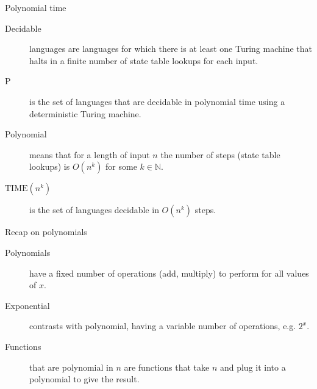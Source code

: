 \begin{frame}{Polynomial time}
  
  
  \begin{description}
    \item[Decidable] languages are languages for which there is at least one Turing machine that halts in a finite number of state table lookups for each input.
    \item[P] is the set of languages that are decidable in polynomial time using a deterministic Turing machine.
    \item[Polynomial] means that for a length of input \( n \) the number of steps (state table lookups) is \( O(n^k) \) for some \( k \in \mathbb{N} \).
    \item[\( \text{TIME}(n^k) \)] is the set of languages decidable in \( O(n^k) \) steps.
  \end{description}

\end{frame}


\begin{frame}[fragile]{Recap on polynomials}
  
  
  \begin{description}
    \item[Polynomials] have a fixed number of operations (add, multiply) to perform for all values of \( x \).
    \item[Exponential] contrasts with polynomial, having a variable number of operations, e.g. \( 2^x \).
    \item[Functions] that are polynomial in $n$ are functions that take $n$ and plug it into a polynomial to give the result.
  \end{description}

  \begin{adjustbox}{max width={0.4\textwidth}, center}
  \end{adjustbox}

\end{frame}


